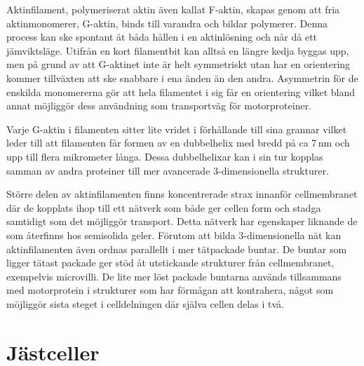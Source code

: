 Aktinfilament, polymeriserat aktin även kallat F-aktin, skapas genom att fria aktinmonomerer, G-aktin, binds till varandra och bildar polymerer. Denna process kan ske spontant åt båda hållen i en aktinlösning och når då ett jämviktsläge. Utifrån en kort filamentbit kan alltså en längre kedja byggas upp, men på grund av att G-aktinet inte är helt symmetriskt utan har en orientering kommer tillväxten att ske snabbare i ena änden än den andra. Asymmetrin för de enskilda monomererna gör att hela filamentet i sig får en orientering vilket bland annat möjliggör dess användning som transportväg för motorproteiner. %

Varje G-aktin i filamenten sitter lite vridet i förhållande till sina grannar vilket leder till att filamenten får formen av en dubbelhelix med bredd på ca 7\,nm och upp till flera mikrometer långa. Dessa dubbelhelixar kan i sin tur kopplas samman av andra proteiner till mer avancerade 3-dimensionella strukturer.

Större delen av aktinfilamenten finns koncentrerade strax innanför cellmembranet där de kopplats ihop till ett nätverk som både ger cellen form och stadga samtidigt som det möjliggör transport. Detta nätverk har egenskaper liknande de som återfinns hos semisolida geler. Förutom att bilda 3-dimensionella nät kan aktinfilamenten även ordnas parallellt i mer tätpackade buntar. De buntar som ligger tätast packade ger stöd åt utstickande strukturer från cellmembranet, exempelvis microvilli. De lite mer löst packade buntarna används tillsammans med motorprotein i strukturer som har förmågan att kontrahera, något som möjliggör sista steget i celldelningen där själva cellen delas i två. 



\section{Jästceller}


